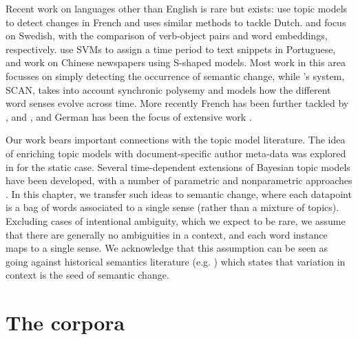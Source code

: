 \documentclass[output=paper]{langscibook}
\begin{document}
Recent work on languages other than English is rare but exists: \citet{falk2014quenelle} use topic models to detect changes in French and \citet{hengchen2017does} uses similar methods to tackle Dutch. 
\citet{cavallin-2012} and \citet{tahmasebi2018study} focus on Swedish, with the comparison of verb-object pairs and word embeddings, respectively.
\citet{zampieri2016modeling} use SVMs to assign a time period to text snippets in Portuguese, and \citet{tang2016} work on Chinese newspapers using S-shaped models. 
Most work in this area focusses on simply detecting the occurrence of semantic change, while  \citet{frermann-lapata-2016-bayesian}'s system, SCAN, takes into account synchronic polysemy and models how the different word senses evolve across time. 
More recently French has been further tackled by \citet{jawahar-seddah-2019-contextualized}, \citet{frossard-etal-2020-dataset} and \citet{montariol-allauzen-2020-etude}, and German has been the focus of extensive work \citep{schlechtweg-etal-2017-german,schlechtweg2018durel,schlechtweg-etal-2019-wind,schlechtweg-etal-2020-semeval}.

Our work bears important connections with the topic model literature. The idea of enriching topic models with document-specific author meta-data was explored in \citet{rosen-zvi2004} for the static case. Several time-dependent extensions of Bayesian topic models have been developed, with a number of parametric and nonparametric approaches \citep{blei2006dynamic, gamma, xing, topictime, perrone2017}. In this chapter, we transfer such ideas to semantic change, where each datapoint is a bag of words associated to a single sense (rather than a mixture of topics). Excluding cases of intentional ambiguity, which we expect to be rare, we assume that there are generally no ambiguities in a context, and each word instance maps to a single sense. We acknowledge that this assumption can be seen as going against historical semantics literature (e.g. \citealt{traugott2001regularity}) which states that variation in context is the seed of semantic change.



\section{The corpora}\label{sec:data}
\end{document}
